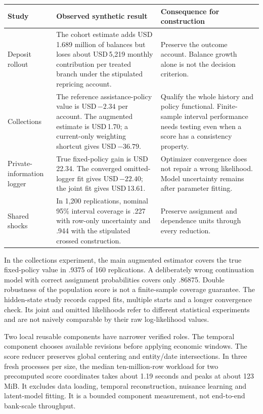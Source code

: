\documentclass[11pt,a4paper,openany]{book}
\begin{document}
\begin{longtable}{P{.20\textwidth}P{.42\textwidth}P{.31\textwidth}}
\toprule
Study & Observed synthetic result & Consequence for construction\\
\midrule\endhead
Deposit rollout &
The cohort estimate adds USD\,1.689 million of balances but loses about
USD\,5,219 monthly contribution per treated branch under the stipulated
repricing account. &
Preserve the outcome account. Balance growth alone is not the decision
criterion.\\
Collections &
The reference assistance-policy value is USD\,$-2.34$ per account.
The augmented estimate is USD\,1.70; a current-only weighting shortcut
gives USD\,$-36.79$. &
Qualify the whole history and policy functional. Finite-sample interval
performance needs testing even when a score has a consistency property.\\
Private-information logger &
True fixed-policy gain is USD\,22.34. The converged omitted-logger fit
gives USD\,$-22.40$; the joint fit gives USD\,13.61. &
Optimizer convergence does not repair a wrong likelihood.
Model uncertainty remains after parameter fitting.\\
Shared shocks &
In 1,200 replications, nominal 95\% interval coverage is .227 with
row-only uncertainty and .944 with the stipulated crossed construction. &
Preserve assignment and dependence units through every reduction.\\
\bottomrule
\end{longtable}

In the collections experiment, the main augmented estimator covers the
true fixed-policy value in .9375 of 160 replications. A deliberately wrong
continuation model with correct assignment probabilities covers only
.86875. Double robustness of the population score is not a finite-sample
coverage guarantee. The hidden-state study records capped fits, multiple
starts and a longer convergence check. Its joint and omitted likelihoods
refer to different statistical experiments and are not naively comparable
by their raw log-likelihood values.

Two local reusable components have narrower verified roles. The temporal
component chooses available revisions before applying economic windows.
The score reducer preserves global centering and entity/date intersections.
In three fresh processes per size, the median ten-million-row workload
for two precomputed score coordinates takes about 1.19 seconds and peaks
at about 123 MiB. It excludes data loading, temporal reconstruction,
nuisance learning and latent-model fitting. It is a bounded component
measurement, not end-to-end bank-scale throughput.
\end{document}
